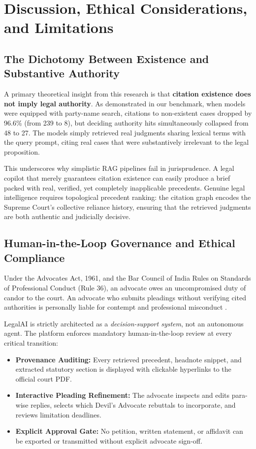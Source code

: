 \documentclass[conference]{IEEEtran}
\begin{document}
\section{Discussion, Ethical Considerations, and Limitations}
\label{sec:discussion}
\subsection{The Dichotomy Between Existence and Substantive Authority}
A primary theoretical insight from this research is that \textbf{citation existence does not imply legal authority}. As demonstrated in our benchmark, when models were equipped with party-name search, citations to non-existent cases dropped by 96.6\% (from 239 to 8), but deciding authority hits simultaneously collapsed from 48 to 27. The models simply retrieved real judgments sharing lexical terms with the query prompt, citing real cases that were substantively irrelevant to the legal proposition.

This underscores why simplistic RAG pipelines fail in jurisprudence. A legal copilot that merely guarantees citation existence can easily produce a brief packed with real, verified, yet completely inapplicable precedents. Genuine legal intelligence requires topological precedent ranking: the citation graph encodes the Supreme Court's collective reliance history, ensuring that the retrieved judgments are both authentic and judicially decisive.

\subsection{Human-in-the-Loop Governance and Ethical Compliance}
Under the Advocates Act, 1961, and the Bar Council of India Rules on Standards of Professional Conduct (Rule 36), an advocate owes an uncompromised duty of candor to the court. An advocate who submits pleadings without verifying cited authorities is personally liable for contempt and professional misconduct \cite{gummadi}.

LegalAI is strictly architected as a \emph{decision-support system}, not an autonomous agent. The platform enforces mandatory human-in-the-loop review at every critical transition:
\begin{itemize}
    \item \textbf{Provenance Auditing:} Every retrieved precedent, headnote snippet, and extracted statutory section is displayed with clickable hyperlinks to the official court PDF.
    \item \textbf{Interactive Pleading Refinement:} The advocate inspects and edits para-wise replies, selects which Devil's Advocate rebuttals to incorporate, and reviews limitation deadlines.
    \item \textbf{Explicit Approval Gate:} No petition, written statement, or affidavit can be exported or transmitted without explicit advocate sign-off.
\end{itemize}
\end{document}
